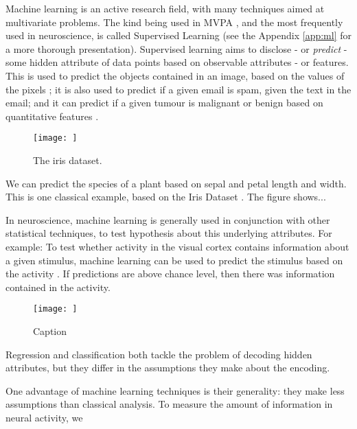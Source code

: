         Machine learning is an active research field, with many techniques aimed at multivariate problems. The kind being used in MVPA \cite{merchant2008we}, and the most frequently used in neuroscience, is called Supervised Learning (see the Appendix \ref{app:ml} for a more thorough presentation). Supervised learning aims to disclose - or \textit{predict} - some hidden attribute of data points based on observable attributes - or features. This is used to predict the objects contained in an image, based on the values of the pixels \cite{}; it is also used to predict if a given email is spam, given the text in the email\cite{}; and it can predict if a given tumour is malignant or benign based on quantitative features \cite{}.
        
        \begin{figure}
            \centering
            \texttt{[image: ]}
            \caption{The iris dataset.}
            \label{fig:iris_prediction}
        \end{figure}
        
        We can predict the species of a plant based on sepal and petal length and width. This is one classical example, based on the Iris Dataset \cite{}. The figure shows...
        
        In neuroscience, machine learning is generally used in conjunction with other statistical techniques, to test hypothesis about this underlying attributes. For example: To test whether activity in the visual cortex contains information about a given stimulus, machine learning can be used to predict the stimulus based on the activity \cite{}. If predictions are above chance level, then there was information contained in the activity. 
        
        \begin{figure}
            \centering
            \texttt{[image: ]}
            \caption{Caption}
            \label{fig:prediction_neuro}
        \end{figure}
        
        Regression and classification both tackle the problem of decoding hidden attributes, but they differ in the assumptions they make about the encoding. 
        
        One advantage of machine learning techniques is their generality: they make less assumptions than classical analysis. To measure the amount of information in neural activity, we 

